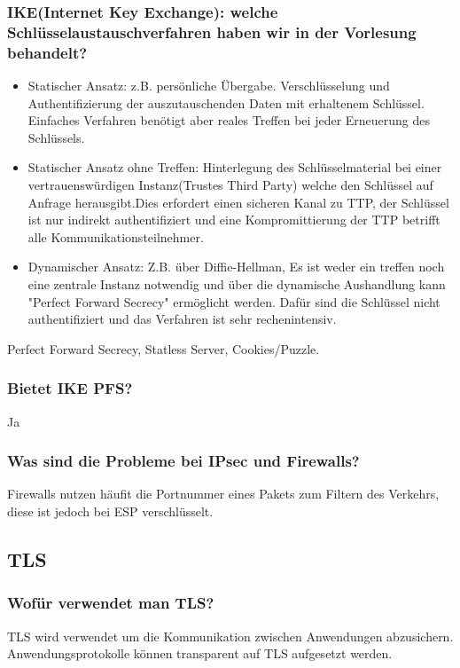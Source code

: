	\subsubsection{IKE(Internet Key Exchange): welche Schlüsselaustauschverfahren haben wir in der Vorlesung behandelt?}
	\begin{itemize}
		\item Statischer Ansatz: z.B. persönliche Übergabe. Verschlüsselung und Authentifizierung der auszutauschenden Daten mit erhaltenem Schlüssel. Einfaches Verfahren benötigt aber reales Treffen bei jeder Erneuerung des Schlüssels.
		\item Statischer Ansatz ohne Treffen: Hinterlegung des Schlüsselmaterial bei einer vertrauenswürdigen Instanz(Trustes Third Party) welche den Schlüssel auf Anfrage herausgibt.Dies erfordert einen sicheren Kanal zu TTP, der Schlüssel ist nur indirekt authentifiziert und eine Kompromittierung der TTP betrifft alle Kommunikationsteilnehmer.
		\item Dynamischer Ansatz: Z.B. über Diffie-Hellman, Es ist weder ein treffen noch eine zentrale Instanz notwendig und über die dynamische Aushandlung kann "Perfect Forward Secrecy" ermöglicht werden. Dafür sind die Schlüssel nicht authentifiziert und das Verfahren ist sehr rechenintensiv.
	\end{itemize}
	Perfect Forward Secrecy, Statless Server, Cookies/Puzzle.
	
	\subsubsection{Bietet IKE PFS?}
	Ja
	
	\subsubsection{Was sind die Probleme bei IPsec und Firewalls?}
	Firewalls nutzen häufit die Portnummer eines Pakets zum Filtern des Verkehrs, diese ist jedoch bei ESP verschlüsselt.
	
	
	
	
	

\subsection{TLS}
	\subsubsection{Wofür verwendet man TLS?}
	TLS wird verwendet um die Kommunikation zwischen Anwendungen abzusichern. Anwendungsprotokolle können transparent auf TLS aufgesetzt werden.
	
